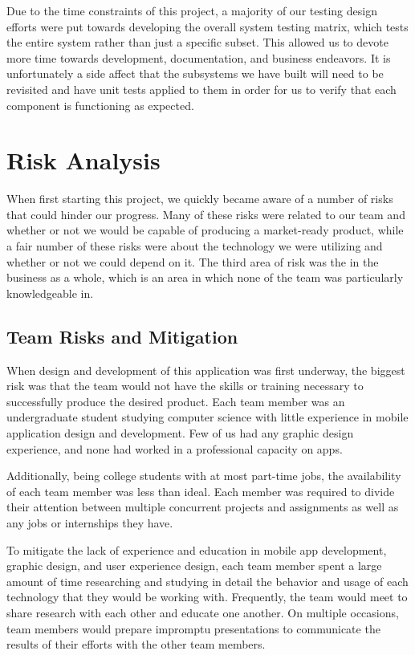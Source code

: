 Due to the time constraints of this project, a majority of our testing design
efforts were put towards developing the overall system testing matrix, which
tests the entire system rather than just a specific subset. This allowed us to
devote more time towards development, documentation, and business endeavors. It
is unfortunately a side affect that the subsystems we have built will need to be
revisited and have unit tests applied to them in order for us to verify that
each component is functioning as expected.


\section{Risk Analysis}

When first starting this project, we quickly became aware of a number of risks
that could hinder our progress. Many of these risks were related to our team and
whether or not we would be capable of producing a market-ready product, while
a fair number of these risks were about the technology we were utilizing and
whether or not we could depend on it. The third area of risk was the in the
business as a whole, which is an area in which none of the team was particularly
knowledgeable in.


\subsection{Team Risks and Mitigation}

When design and development of this application was first underway, the biggest
risk was that the team would not have the skills or training necessary to
successfully produce the desired product. Each team member was an undergraduate
student studying computer science with little experience in mobile application
design and development. Few of us had any graphic design experience, and none
had worked in a professional capacity on apps.

Additionally, being college students with at most part-time jobs, the
availability of each team member was less than ideal. Each member was required
to divide their attention between multiple concurrent projects and assignments
as well as any jobs or internships they have.

To mitigate the lack of experience and education in mobile app development,
graphic design, and user experience design, each team member spent a large
amount of time researching and studying in detail the behavior and usage of each
technology that they would be working with. Frequently, the team would meet to
share research with each other and educate one another. On multiple occasions,
team members would prepare impromptu presentations to communicate the results
of their efforts with the other team members.

